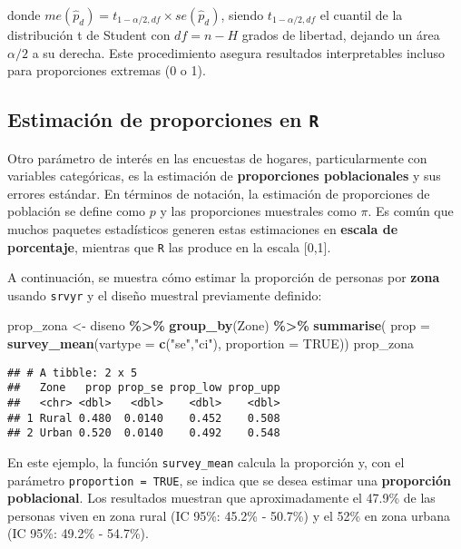 \documentclass[
  12pt,
]{book}
\newenvironment{Shaded}{\begin{snugshade}}{\end{snugshade}}
\newcommand{\AttributeTok}[1]{\textcolor[rgb]{0.13,0.29,0.53}{#1}}
\newcommand{\ConstantTok}[1]{\textcolor[rgb]{0.56,0.35,0.01}{#1}}
\newcommand{\FunctionTok}[1]{\textcolor[rgb]{0.13,0.29,0.53}{\textbf{#1}}}
\newcommand{\NormalTok}[1]{#1}
\newcommand{\OtherTok}[1]{\textcolor[rgb]{0.56,0.35,0.01}{#1}}
\newcommand{\SpecialCharTok}[1]{\textcolor[rgb]{0.81,0.36,0.00}{\textbf{#1}}}
\newcommand{\StringTok}[1]{\textcolor[rgb]{0.31,0.60,0.02}{#1}}
\begin{document}
donde \(me(\hat{p}_d) = t_{1-\alpha/2, df} \times se(\hat{p}_d)\), siendo \(t_{1-\alpha/2, df}\) el cuantil de la distribución t de Student con \(df = n - H\) grados de libertad, dejando un área \(\alpha/2\) a su derecha. Este procedimiento asegura resultados interpretables incluso para proporciones extremas (0 o 1).

\subsection{\texorpdfstring{Estimación de proporciones en \texttt{R}}{Estimación de proporciones en R}}\label{estimaciuxf3n-de-proporciones-en-r}

Otro parámetro de interés en las encuestas de hogares, particularmente con variables categóricas, es la estimación de \textbf{proporciones poblacionales} y sus errores estándar. En términos de notación, la estimación de proporciones de población se define como \(p\) y las proporciones muestrales como \(\pi\). Es común que muchos paquetes estadísticos generen estas estimaciones en \textbf{escala de porcentaje}, mientras que \texttt{R} las produce en la escala {[}0,1{]}.

A continuación, se muestra cómo estimar la proporción de personas por \textbf{zona} usando \texttt{srvyr} y el diseño muestral previamente definido:

\begin{Shaded}
\begin{Highlighting}[]
\NormalTok{prop\_zona }\OtherTok{\textless{}{-}}\NormalTok{ diseno }\SpecialCharTok{\%\textgreater{}\%} \FunctionTok{group\_by}\NormalTok{(Zone) }\SpecialCharTok{\%\textgreater{}\%} 
             \FunctionTok{summarise}\NormalTok{(}
               \AttributeTok{prop =} \FunctionTok{survey\_mean}\NormalTok{(}\AttributeTok{vartype =} \FunctionTok{c}\NormalTok{(}\StringTok{"se"}\NormalTok{,}\StringTok{"ci"}\NormalTok{), }
                                  \AttributeTok{proportion =} \ConstantTok{TRUE}\NormalTok{))}
\NormalTok{prop\_zona}
\end{Highlighting}
\end{Shaded}

\begin{verbatim}
## # A tibble: 2 x 5
##   Zone   prop prop_se prop_low prop_upp
##   <chr> <dbl>   <dbl>    <dbl>    <dbl>
## 1 Rural 0.480  0.0140    0.452    0.508
## 2 Urban 0.520  0.0140    0.492    0.548
\end{verbatim}

En este ejemplo, la función \texttt{survey\_mean} calcula la proporción y, con el parámetro \texttt{proportion\ =\ TRUE}, se indica que se desea estimar una \textbf{proporción poblacional}. Los resultados muestran que aproximadamente el 47.9\% de las personas viven en zona rural (IC 95\%: 45.2\% - 50.7\%) y el 52\% en zona urbana (IC 95\%: 49.2\% - 54.7\%).
\end{document}
